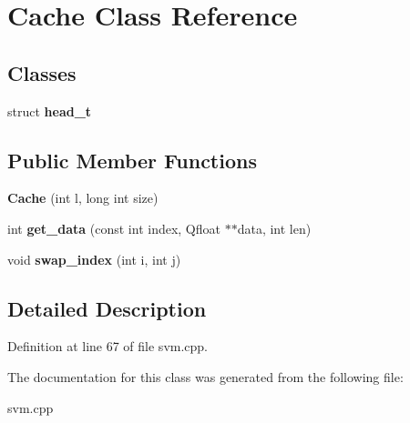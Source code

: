 \hypertarget{class_cache}{
\section{Cache Class Reference}
\label{class_cache}
}
\subsection*{Classes}
\begin{DoxyCompactItemize}
\item 
struct {\bfseries head\_\-t}
\end{DoxyCompactItemize}
\subsection*{Public Member Functions}
\begin{DoxyCompactItemize}
\item 
\hypertarget{class_cache_a2823f543d4f9b92c29472b904961afe1}{
{\bfseries Cache} (int l, long int size)}
\label{class_cache_a2823f543d4f9b92c29472b904961afe1}

\item 
\hypertarget{class_cache_aca49263fb34641e208884cc223b25317}{
int {\bfseries get\_\-data} (const int index, Qfloat $\ast$$\ast$data, int len)}
\label{class_cache_aca49263fb34641e208884cc223b25317}

\item 
\hypertarget{class_cache_aaff2dc955f9492c044c98a5f09cfddcc}{
void {\bfseries swap\_\-index} (int i, int j)}
\label{class_cache_aaff2dc955f9492c044c98a5f09cfddcc}

\end{DoxyCompactItemize}


\subsection{Detailed Description}


Definition at line 67 of file svm.cpp.



The documentation for this class was generated from the following file:\begin{DoxyCompactItemize}
\item 
svm.cpp\end{DoxyCompactItemize}
